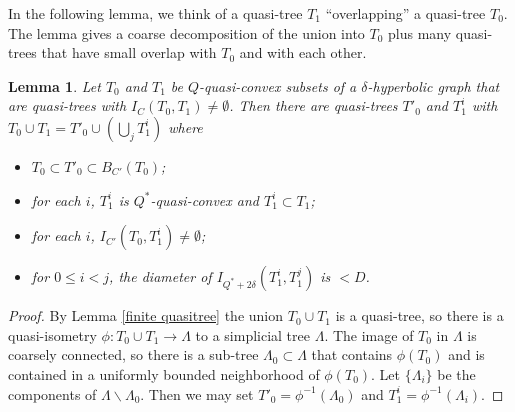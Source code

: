 \documentclass[11pt]{article}
\newtheorem{lemma}[thm]{Lemma}
\theoremstyle{remark}
\begin{document}
In the following lemma, we think of a quasi-tree $T_1$ ``overlapping'' a
quasi-tree $T_0$. The lemma gives a coarse decomposition of the union
into $T_0$ plus many quasi-trees that have small overlap with $T_0$ and
with each other.

\begin{lemma}\label{subtrees}
Let $T_0$ and  $T_1$ be $Q$-quasi-convex subsets of a $\delta$-hyperbolic graph that are quasi-trees with $I_C(T_0, T_1) \neq \emptyset$. Then there are quasi-trees $T'_0$ and $T^i_1$ with 
 $T_0 \cup T_1 = T'_0 \cup \left(\bigcup_j T^i_1\right)$
where
\begin{itemize}
\item $T_0 \subset T'_0\subset B_{C'}(T_0)$;

\item for each $i$, $T_1^i$ is $Q^*$-quasi-convex and $T_1^i \subset T_1$;

\item for each $i$, $I_{C'}(T_0, T^i_1) \neq \emptyset$;

\item for $0\le i<j$, the diameter of $I_{Q^*+2\delta}(T^i_1, T^j_1)$ is $< D$.
\end{itemize}
\end{lemma}


\begin{proof}
By Lemma \ref{finite quasitree} the union $T_0 \cup T_1$ is a quasi-tree, so there is a quasi-isometry $\phi\colon T_0\cup T_1 \to \Lambda$ to a simplicial tree $\Lambda$. The image of $T_0$ in $\Lambda$ is coarsely connected, so there is a sub-tree $\Lambda_0\subset \Lambda$ that contains $\phi(T_0)$ and is contained in a uniformly bounded neighborhood of $\phi(T_0)$. Let $\{\Lambda_i\}$ be the components of $\Lambda\smallsetminus \Lambda_0$. Then we may set
$T'_0 = \phi^{-1}(\Lambda_0)$ and $T^i_1 = \phi^{-1}(\Lambda_i)$.
\end{proof}
\end{document}
